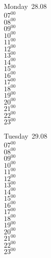 \documentclass[11pt, a4paper]{book}\usepackage[]{graphicx}\usepackage[]{color}
\begin{document}
\begin{headerbox}
\end{headerbox}
\begin{weekdaybox}
  Monday~28.08\\
  { 
  \vfill
  $07^{00}$\\
$08^{00}$\\
$09^{00}$\\
$10^{00}$\\
$11^{00}$\\
$12^{00}$\\
$13^{00}$\\
$14^{00}$\\
$15^{00}$\\
$16^{00}$\\
$17^{00}$\\
$18^{00}$\\
$19^{00}$\\
$20^{00}$\\
$21^{00}$\\
$22^{00}$\\
$23^{00}$\\
  }
\end{weekdaybox}
\begin{weekdaybox}
  Tuesday~29.08\\
  { 
  \vfill
  $07^{00}$\\
$08^{00}$\\
$09^{00}$\\
$10^{00}$\\
$11^{00}$\\
$12^{00}$\\
$13^{00}$\\
$14^{00}$\\
$15^{00}$\\
$16^{00}$\\
$17^{00}$\\
$18^{00}$\\
$19^{00}$\\
$20^{00}$\\
$21^{00}$\\
$22^{00}$\\
$23^{00}$\\
  }
\end{weekdaybox}
\end{document}
